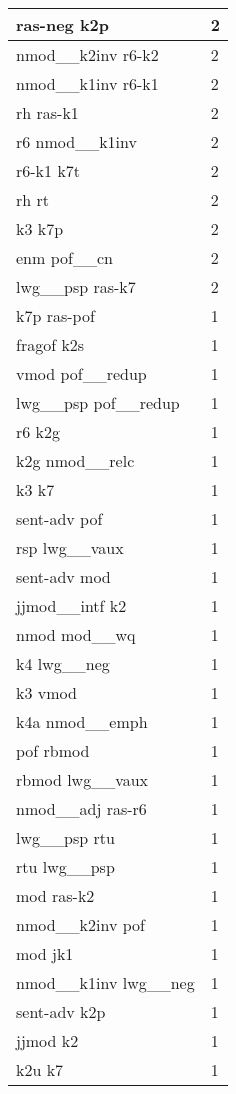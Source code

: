 \documentclass[a4 paper]{article}
\begin{document}
\begin{longtable}{p{}p{}}
ras-neg k2p  & 2 \\ \midrule
nmod\_\_k2inv r6-k2  & 2 \\ \midrule
nmod\_\_k1inv r6-k1  & 2 \\ \midrule
rh ras-k1  & 2 \\ \midrule
r6 nmod\_\_k1inv  & 2 \\ \midrule
r6-k1 k7t  & 2 \\ \midrule
rh rt  & 2 \\ \midrule
k3 k7p  & 2 \\ \midrule
enm pof\_\_cn  & 2 \\ \midrule
lwg\_\_psp ras-k7  & 2 \\ \midrule
k7p ras-pof  & 1 \\ \midrule
fragof k2s  & 1 \\ \midrule
vmod pof\_\_redup  & 1 \\ \midrule
lwg\_\_psp pof\_\_redup  & 1 \\ \midrule
r6 k2g  & 1 \\ \midrule
k2g nmod\_\_relc  & 1 \\ \midrule
k3 k7  & 1 \\ \midrule
sent-adv pof  & 1 \\ \midrule
rsp lwg\_\_vaux  & 1 \\ \midrule
sent-adv mod  & 1 \\ \midrule
jjmod\_\_intf k2  & 1 \\ \midrule
nmod mod\_\_wq  & 1 \\ \midrule
k4 lwg\_\_neg  & 1 \\ \midrule
k3 vmod  & 1 \\ \midrule
k4a nmod\_\_emph  & 1 \\ \midrule
pof rbmod  & 1 \\ \midrule
rbmod lwg\_\_vaux  & 1 \\ \midrule
nmod\_\_adj ras-r6  & 1 \\ \midrule
lwg\_\_psp rtu  & 1 \\ \midrule
rtu lwg\_\_psp  & 1 \\ \midrule
mod ras-k2  & 1 \\ \midrule
nmod\_\_k2inv pof  & 1 \\ \midrule
mod jk1  & 1 \\ \midrule
nmod\_\_k1inv lwg\_\_neg  & 1 \\ \midrule
sent-adv k2p  & 1 \\ \midrule
jjmod k2  & 1 \\ \midrule
k2u k7  & 1 \\ \midrule

\end{longtable}
\end{document}
